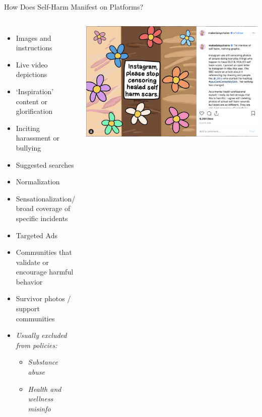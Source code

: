 \documentclass[nobackground,dvipsnames,table]{beamer}
\begin{document}
\begin{frame}{How Does Self-Harm Manifest on Platforms?}
    \begin{columns}
            \footnotesize
            \begin{itemize}
                \item Images and instructions
                \item Live video depictions
                \item ‘Inspiration’ content or glorification
                \item Inciting harassment or bullying
                \item Suggested searches
                \item Normalization 
                \item Sensationalization/ broad coverage of specific incidents
                \item Targeted Ads
                \item Communities that validate or encourage harmful behavior
                \item Survivor photos / support communities
                \item \textit{Usually excluded from policies:}
                \begin{itemize}
                    \footnotesize
                    \item \textit{Substance abuse}
                    \item \textit{Health and wellness misinfo}
                \end{itemize}
            \end{itemize}
            \includegraphics[width=\textwidth]{message-to-instagram}
    \end{columns}
\end{frame}
\end{document}
